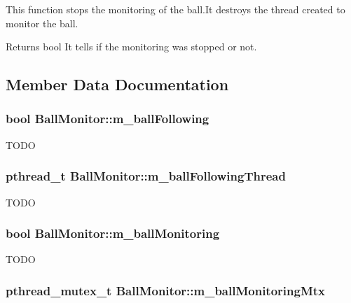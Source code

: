 This function stops the monitoring of the ball.It destroys the thread created to monitor the ball. 

\begin{DoxyReturn}{Returns}
bool It tells if the monitoring was stopped or not. 
\end{DoxyReturn}


\subsection{Member Data Documentation}
\hypertarget{classBallMonitor_ada441cfbcbac3335a118348945e8b6c7}{
\subsubsection[{m\_\-ballFollowing}]{\setlength{\rightskip}{0pt plus 5cm}bool {\bf BallMonitor::m\_\-ballFollowing}}}
\label{classBallMonitor_ada441cfbcbac3335a118348945e8b6c7}
TODO \hypertarget{classBallMonitor_af2b98e5dca99d4d2efc01330d84400d6}{
\subsubsection[{m\_\-ballFollowingThread}]{\setlength{\rightskip}{0pt plus 5cm}pthread\_\-t {\bf BallMonitor::m\_\-ballFollowingThread}}}
\label{classBallMonitor_af2b98e5dca99d4d2efc01330d84400d6}
TODO \hypertarget{classBallMonitor_ac991e138d7e4ae238d2a68365c1caa68}{
\subsubsection[{m\_\-ballMonitoring}]{\setlength{\rightskip}{0pt plus 5cm}bool {\bf BallMonitor::m\_\-ballMonitoring}}}
\label{classBallMonitor_ac991e138d7e4ae238d2a68365c1caa68}
TODO \hypertarget{classBallMonitor_a5a9a84961419fefc7131d449bab07b0f}{
\subsubsection[{m\_\-ballMonitoringMtx}]{\setlength{\rightskip}{0pt plus 5cm}pthread\_\-mutex\_\-t {\bf BallMonitor::m\_\-ballMonitoringMtx}}}
